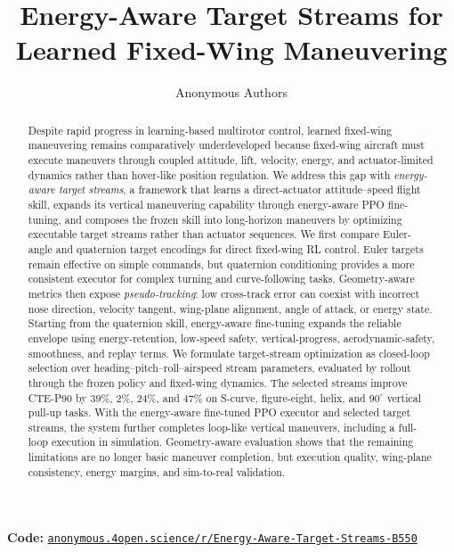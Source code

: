 \documentclass{article}
\title{Energy-Aware Target Streams for Learned Fixed-Wing Maneuvering}
\author{Anonymous Authors}
\begin{document}
\maketitle


\begin{abstract}
Despite rapid progress in learning-based multirotor control, learned fixed-wing maneuvering remains comparatively underdeveloped because fixed-wing aircraft must execute maneuvers through coupled attitude, lift, velocity, energy, and actuator-limited dynamics rather than hover-like position regulation.
We address this gap with \emph{energy-aware target streams}, a framework that learns a direct-actuator attitude--speed flight skill, expands its vertical maneuvering capability through energy-aware PPO fine-tuning, and composes the frozen skill into long-horizon maneuvers by optimizing executable target streams rather than actuator sequences.
We first compare Euler-angle and quaternion target encodings for direct fixed-wing RL control. Euler targets remain effective on simple commands, but quaternion conditioning provides a more consistent executor for complex turning and curve-following tasks.
Geometry-aware metrics then expose \emph{pseudo-tracking}: low cross-track error can coexist with incorrect nose direction, velocity tangent, wing-plane alignment, angle of attack, or energy state.
Starting from the quaternion skill, energy-aware fine-tuning expands the reliable envelope using energy-retention, low-speed safety, vertical-progress, aerodynamic-safety, smoothness, and replay terms.
We formulate target-stream optimization as closed-loop selection over heading--pitch--roll--airspeed stream parameters, evaluated by rollout through the frozen policy and fixed-wing dynamics.
The selected streams improve CTE-P90 by 39\%, 2\%, 24\%, and 47\% on S-curve, figure-eight, helix, and $90^\circ$ vertical pull-up tasks.
With the energy-aware fine-tuned PPO executor and selected target streams, the system further completes loop-like vertical maneuvers, including a full-loop execution in simulation.
Geometry-aware evaluation shows that the remaining limitations are no longer basic maneuver completion, but execution quality, wing-plane consistency, energy margins, and sim-to-real validation.
\end{abstract}

\vspace{-0.4em}
\begingroup
\small
\setlength{\leftskip}{0.67in}
\noindent\textbf{Code:}
\href{https://anonymous.4open.science/r/Energy-Aware-Target-Streams-for-Learned-Fixed-Wing-Maneuvering-B550/}
{\texttt{anonymous.4open.science/r/Energy-Aware-Target-Streams-B550}}
\par
\endgroup
\vspace{0.3em}
\end{document}
